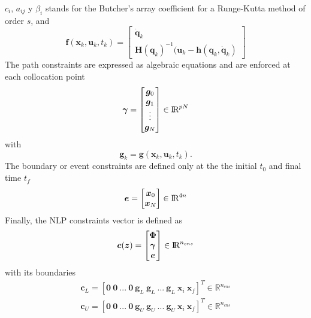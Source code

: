\documentclass[12pt]{article}
\newcommand{\real}{\mbox{\rm I$\!$R}}
\begin{document}
\noindent $c_{i}$, $a_{ij}$ y $\beta_{i}$ stands for the Butcher's array coefficient for a Runge-Kutta method of order $s$, and
%
\begin{equation}\label{eq:dynamics_discrete}
\bm{f}(\bm{x}_k,\bm{u}_k,t_k)=\begin{bmatrix}\dot{\bm{q}}_k
\\ \bm{H}(\bm{q}_k)^{-1}(\bm{u}_k-\bm{h}(\bm{q}_k,\dot{\bm{q}}_k)
\end{bmatrix} 
\end{equation}
%
The path constraints are expressed as algebraic equations and are enforced at each collocation point
%
\begin{equation}\label{eq:path_vec}
\bm{\gamma}=\begin{bmatrix}
\bm{g}_{0} \\
\bm{g}_{1} \\ 
\vdots \\
\bm{g}_{N}
\end{bmatrix} \in \real^{pN}
\end{equation}
%
with 
%
\begin{equation}\label{eq:pathcns}
\bm{g}_{k}=\bm{g}(\bm{x}_{k},\bm{u}_{k},t_{k}).
\end{equation}
%
The boundary or event constraints are defined only at the the initial $t_0$ and final time $t_f$
%
\begin{equation}\label{eq:event}
\bm{e}=\begin{bmatrix}
\bm{x}_{0}\\
\bm{x}_{N} 
\end{bmatrix}  \in \real^{4n}
\end{equation} 
%
Finally, the NLP constraints vector is defined as
%
\begin{equation}\label{eq:cnsvector}
\bm{c}(\bm{z})=\begin{bmatrix}
\bm{\Phi} \\ 
\bm{\gamma} \\  
\bm{e} 
\end{bmatrix} \in \real^{n_{cns}}
\end{equation}
%
with its boundaries
%
\begin{eqnarray}
\bm{c}_{L}=[\bm{0} \ \bm{0} \ ... \ \bm{0} \ \bm{g}_{L} \ \bm{g}_{L} \ ... \ \bm{g}_{L} \ \bm{x}_{i} \ \bm{x}_{f}]^T\in \mathbb{R}^{n_{cns}}\\
\bm{c}_{U}=[\bm{0} \ \bm{0} \ ... \ \bm{0} \ \bm{g}_{U} \ \bm{g}_{U} \ ... \ \bm{g}_{U} \ \bm{x}_{i} \ \bm{x}_{f}]^T \in \mathbb{R}^{n_{cns}}
\end{eqnarray}
\end{document}
